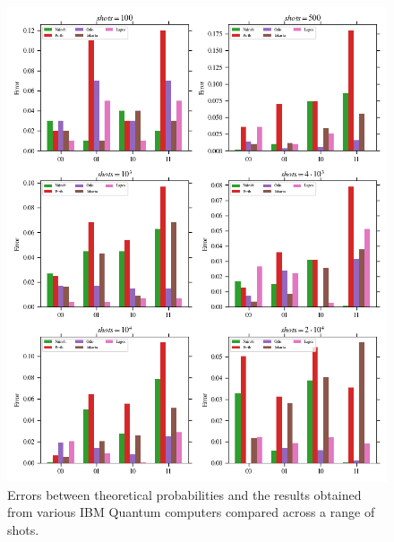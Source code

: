 \begin{figure}[h!]
\centering
\includegraphics[width=\textwidth]{images/quantum_benchmark_error.png}
\caption{Errors between theoretical probabilities and the results obtained from various IBM Quantum computers compared across a range of shots.}
\label{fig:quantum_benchmark_error}
\end{figure}